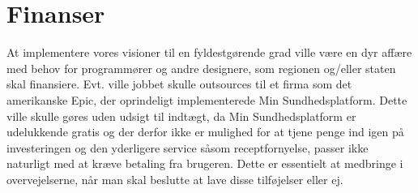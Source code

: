 \section{Finanser}
At implementere vores visioner til en fyldestgørende grad ville være en dyr affære med behov for programmører og andre designere, som regionen og/eller staten skal finansiere. Evt. ville jobbet skulle outsources til et firma som det amerikanske Epic, der oprindeligt implementerede Min Sundhedsplatform. Dette ville skulle gøres uden udsigt til indtægt, da Min Sundhedsplatform er udelukkende gratis og der derfor ikke er mulighed for at tjene penge ind igen på investeringen og den yderligere service såsom receptfornyelse, passer ikke naturligt med at kræve betaling fra brugeren. Dette er essentielt at medbringe i overvejelserne, når man skal beslutte at lave disse tilføjelser eller ej. 
